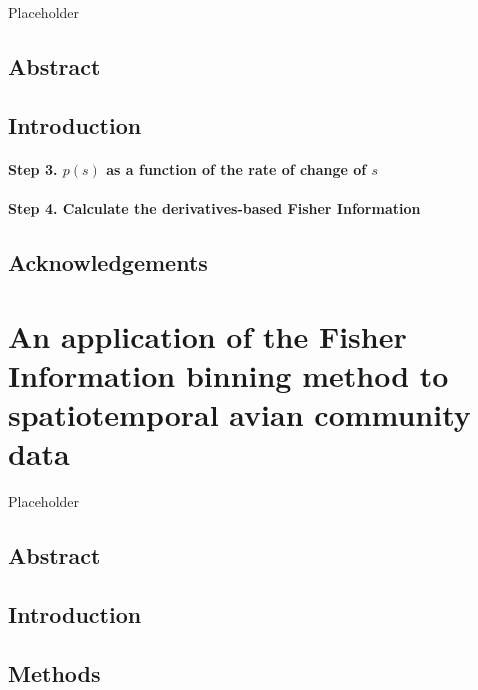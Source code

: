 \documentclass[12pt,twoside]{reedthesis}
\begin{document}
Placeholder

\section{Abstract}\label{abstract-1}

\section{Introduction}\label{introduction-1}

\subsubsection{\texorpdfstring{\textbf{Step 3.} \(p(s)\) as a function
of the rate of change of
\(s\)}{Step 3. p(s) as a function of the rate of change of s}}\label{step-3.-ps-as-a-function-of-the-rate-of-change-of-s}

\subsubsection{\texorpdfstring{\textbf{Step 4.} Calculate the
derivatives-based Fisher
Information}{Step 4. Calculate the derivatives-based Fisher Information}}\label{step-4.-calculate-the-derivatives-based-fisher-information}

\section{Acknowledgements}\label{acknowledgements-1}

\chapter{An application of the Fisher Information binning method to
spatiotemporal avian community
data}\label{an-application-of-the-fisher-information-binning-method-to-spatiotemporal-avian-community-data}

Placeholder

\section{Abstract}\label{abstract-2}

\section{Introduction}\label{introduction-2}

\section{Methods}\label{methods-1}
\end{document}
